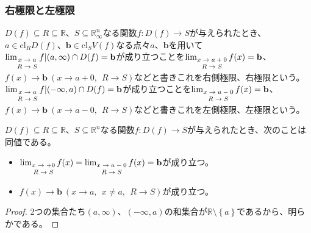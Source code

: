 \documentclass[dvipdfmx]{jsarticle}
\begin{document}
\subsubsection{右極限と左極限}%
\begin{dfn}
$D(f) \subseteq R \subseteq \mathbb{R}$、$S \subseteq \mathbb{R}_{\infty}^{n}$なる関数$f:D(f) \rightarrow S$が与えられたとき、$a \in \mathrm{cl}_{R}{D(f)}$、$\mathbf{b} \in \mathrm{cl}_{S}{V(f)}$なる点々$a$、$\mathbf{b}$を用いて$\lim_{\scriptsize \begin{matrix} x \rightarrow a \\ R \rightarrow S \end{matrix}}{f|(a,\infty) \cap D(f)} = \mathbf{b}$が成り立つことを$\lim_{\scriptsize \begin{matrix} x \rightarrow a + 0 \\ R \rightarrow S \end{matrix}}{f(x)} = \mathbf{b}$、$f(x) \rightarrow \mathbf{b}\ \left( x \rightarrow a + 0,\ \ R \rightarrow S \right)$などと書きこれを右側極限、右極限という。$\lim_{\scriptsize \begin{matrix} x \rightarrow a \\ R \rightarrow S \end{matrix}}{f|( - \infty,a) \cap D(f)} = \mathbf{b}$が成り立つことを$\lim_{\scriptsize \begin{matrix} x \rightarrow a - 0 \\ R \rightarrow S \end{matrix}}{f(x)} = \mathbf{b}$、$f(x) \rightarrow \mathbf{b}\ (x \rightarrow a - 0,\ \ R \rightarrow S)$などと書きこれを左側極限、左極限という。
\end{dfn}
\begin{thm}\label{4.1.10.15}
$D(f) \subseteq R \subseteq \mathbb{R}$、$S \subseteq \mathbb{R}^{n}$なる関数$f:D(f) \rightarrow S$が与えられたとき、次のことは同値である。
\begin{itemize}
\item
  $\lim_{\scriptsize \begin{matrix} x \rightarrow + 0 \\ R \rightarrow S \end{matrix}}{f(x)} = \lim_{\scriptsize \begin{matrix} x \rightarrow a - 0 \\ R \rightarrow S \end{matrix}}{f(x)} = \mathbf{b}$が成り立つ。
\item
  $f(x) \rightarrow \mathbf{b}\ (x \rightarrow a,\ \ x \neq a,\ \ R \rightarrow S)$が成り立つ。
\end{itemize}
\end{thm}
\begin{proof}
2つの集合たち$(a,\infty)$、$( - \infty,a)$の和集合が$\mathbb{R} \setminus \left\{ a \right\}$であるから、明らかである。
\end{proof}
\end{document}
